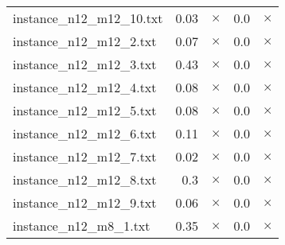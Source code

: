 \documentclass{article}
\begin{document}
\begin{center}
\begin{tabular}{lrrrr}
instance\_n12\_m12\_10.txt & 0.03 & 
$\times$
 & 0.0 & 
$\times$
\\
instance\_n12\_m12\_2.txt & 0.07 & 
$\times$
 & 0.0 & 
$\times$
\\
instance\_n12\_m12\_3.txt & 0.43 & 
$\times$
 & 0.0 & 
$\times$
\\
instance\_n12\_m12\_4.txt & 0.08 & 
$\times$
 & 0.0 & 
$\times$
\\
instance\_n12\_m12\_5.txt & 0.08 & 
$\times$
 & 0.0 & 
$\times$
\\
instance\_n12\_m12\_6.txt & 0.11 & 
$\times$
 & 0.0 & 
$\times$
\\
instance\_n12\_m12\_7.txt & 0.02 & 
$\times$
 & 0.0 & 
$\times$
\\
instance\_n12\_m12\_8.txt & 0.3 & 
$\times$
 & 0.0 & 
$\times$
\\
instance\_n12\_m12\_9.txt & 0.06 & 
$\times$
 & 0.0 & 
$\times$
\\
instance\_n12\_m8\_1.txt & 0.35 & 
$\times$
 & 0.0 & 
$\times$
\\
\hline\end{tabular}
\end{center}
\end{document}
